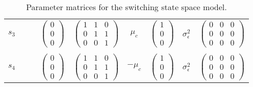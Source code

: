 \documentclass[12pt]{article}
\begin{document}
\begin{table}
\begin{tabular}[h!]{@{}llccccccc@{}}
  $s_3$ & && $\begin{pmatrix} 0 \\ 0 \\ 0 \end{pmatrix}$ & $\begin{pmatrix} 1&1&0 \\ 0&1&1 \\ 0&0&1 \end{pmatrix}$ & $\mu_c$ & $\begin{pmatrix} 1\\ 0 \\ 0 \end{pmatrix}$ & $\sigma_\epsilon^2$ & $\begin{pmatrix} 0&0&0 \\ 0&0&0 \\ 0&0&0 \end{pmatrix}$\\
  \\
  $s_4$ & && $\begin{pmatrix} 0 \\ 0 \\ 0 \end{pmatrix}$ & $\begin{pmatrix} 1&1&0 \\ 0&1&1 \\ 0&0&1 \end{pmatrix}$ & $-\mu_c$ & $\begin{pmatrix} 1\\ 0 \\ 0 \end{pmatrix}$ & $\sigma_\epsilon^2$ & $\begin{pmatrix} 0&0&0 \\ 0&0&0 \\ 0&0&0 \end{pmatrix}$\\

\bottomrule
\end{tabular}
\caption{Parameter matrices for the switching state space model.\label{tab:parmats}}
\end{table}
\end{document}
